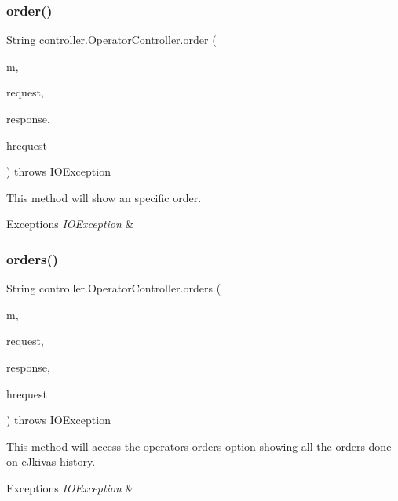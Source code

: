 \subsubsection{\texorpdfstring{order()}{order()}}
{\footnotesize\ttfamily String controller.\+Operator\+Controller.\+order (\begin{DoxyParamCaption}\item[{Model}]{m,  }\item[{Web\+Request}]{request,  }\item[{Http\+Servlet\+Response}]{response,  }\item[{Http\+Servlet\+Request}]{hrequest }\end{DoxyParamCaption}) throws I\+O\+Exception\hspace{0.3cm}{\ttfamily [inline]}}

This method will show an specific order. 
\begin{DoxyExceptions}{Exceptions}
{\em I\+O\+Exception} & \\
\hline
\end{DoxyExceptions}
\mbox{\label{classcontroller_1_1_operator_controller_a79b22da6d85dc475cd7973d4f9a47fc1}} 
\subsubsection{\texorpdfstring{orders()}{orders()}}
{\footnotesize\ttfamily String controller.\+Operator\+Controller.\+orders (\begin{DoxyParamCaption}\item[{Model}]{m,  }\item[{Web\+Request}]{request,  }\item[{Http\+Servlet\+Response}]{response,  }\item[{Http\+Servlet\+Request}]{hrequest }\end{DoxyParamCaption}) throws I\+O\+Exception\hspace{0.3cm}{\ttfamily [inline]}}

This method will access the operator\textquotesingle{}s \textquotesingle{}orders\textquotesingle{} option showing all the orders done on e\+Jkiva\textquotesingle{}s history. 
\begin{DoxyExceptions}{Exceptions}
{\em I\+O\+Exception} & \\
\hline
\end{DoxyExceptions}
\mbox{\label{classcontroller_1_1_operator_controller_ac1739e3ad5746eb50e72a79df2cd7aca}} 
